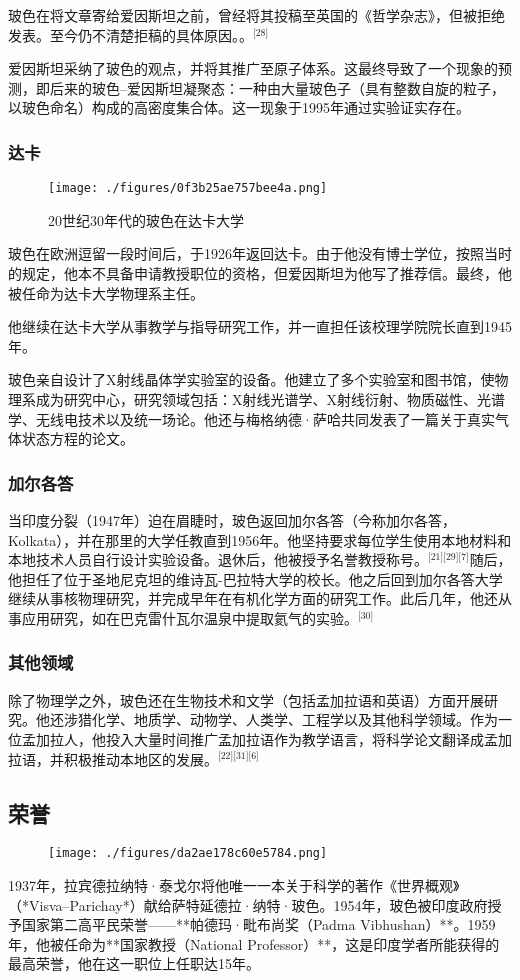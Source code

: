 玻色在将文章寄给爱因斯坦之前，曾经将其投稿至英国的《哲学杂志》，但被拒绝发表。至今仍不清楚拒稿的具体原因。。\(^\text{[28]}\)

爱因斯坦采纳了玻色的观点，并将其推广至原子体系。这最终导致了一个现象的预测，即后来的玻色–爱因斯坦凝聚态：一种由大量玻色子（具有整数自旋的粒子，以玻色命名）构成的高密度集合体。这一现象于1995年通过实验证实存在。
\subsubsection{达卡}
\begin{figure}[ht]
\centering
\texttt{[image: ./figures/0f3b25ae757bee4a.png]}
\caption{20世纪30年代的玻色在达卡大学} \label{fig_BOSE_4}
\end{figure}
玻色在欧洲逗留一段时间后，于1926年返回达卡。由于他没有博士学位，按照当时的规定，他本不具备申请教授职位的资格，但爱因斯坦为他写了推荐信。最终，他被任命为达卡大学物理系主任。

他继续在达卡大学从事教学与指导研究工作，并一直担任该校理学院院长直到1945年。

玻色亲自设计了X射线晶体学实验室的设备。他建立了多个实验室和图书馆，使物理系成为研究中心，研究领域包括：X射线光谱学、X射线衍射、物质磁性、光谱学、无线电技术以及统一场论。他还与梅格纳德·萨哈共同发表了一篇关于真实气体状态方程的论文。
\subsubsection{加尔各答}
当印度分裂（1947年）迫在眉睫时，玻色返回加尔各答（今称加尔各答，Kolkata），并在那里的大学任教直到1956年。他坚持要求每位学生使用本地材料和本地技术人员自行设计实验设备。退休后，他被授予名誉教授称号。\(^\text{[21][29][7]}\)随后，他担任了位于圣地尼克坦的维诗瓦-巴拉特大学的校长。他之后回到加尔各答大学继续从事核物理研究，并完成早年在有机化学方面的研究工作。此后几年，他还从事应用研究，如在巴克雷什瓦尔温泉中提取氦气的实验。\(^\text{[30]}\)
\subsubsection{其他领域}
除了物理学之外，玻色还在生物技术和文学（包括孟加拉语和英语）方面开展研究。他还涉猎化学、地质学、动物学、人类学、工程学以及其他科学领域。作为一位孟加拉人，他投入大量时间推广孟加拉语作为教学语言，将科学论文翻译成孟加拉语，并积极推动本地区的发展。\(^\text{[22][31][6]}\)
\subsection{荣誉}
\begin{figure}[ht]
\centering
\texttt{[image: ./figures/da2ae178c60e5784.png]}
\caption{} \label{fig_BOSE_5}
\end{figure}
1937年，拉宾德拉纳特·泰戈尔将他唯一一本关于科学的著作《世界概观》（*Visva–Parichay*）献给萨特延德拉·纳特·玻色。1954年，玻色被印度政府授予国家第二高平民荣誉——**帕德玛·毗布尚奖（Padma Vibhushan）**。1959年，他被任命为**国家教授（National Professor）**，这是印度学者所能获得的最高荣誉，他在这一职位上任职达15年。

